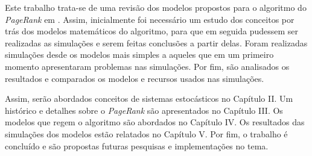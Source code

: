 Este trabalho trata-se de uma revisão dos modelos propostos para o algoritmo do \textit{PageRank} em \cite{ishii2014pagerank}. Assim, inicialmente foi necessário um estudo dos conceitos por trás dos modelos matemáticos do algoritmo, para que em seguida pudessem ser realizadas as simulações e serem feitas conclusões a partir delas. Foram realizadas simulações desde os modelos mais simples a aqueles que em um primeiro momento apresentaram problemas nas simulações. Por fim, são analisados os resultados e comparados os modelos e recursos usados nas simulações.

Assim, serão abordados conceitos de sistemas estocásticos no Capítulo II. Um histórico e detalhes sobre o \textit{PageRank} são apresentados no Capítulo III. Os modelos que regem o algoritmo são abordados no Capítulo IV. Os resultados das simulações dos modelos estão relatados no Capítulo V. Por fim, o trabalho é concluído e são propostas futuras pesquisas e implementações no tema.